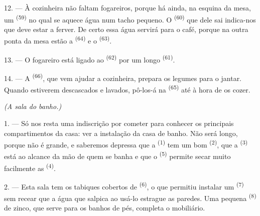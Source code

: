 12. --- À cozinheira não faltam fogareiros, porque há ainda, na esquina
da mesa, um  \textsuperscript{(59)} no qual se aquece água
num tacho pequeno. O  \textsuperscript{(60)} que dele sai indica-nos
que deve estar a ferver. De certo essa água servirá para o café, porque
na outra ponta da mesa estão a  \textsuperscript{(64)} e o
 \textsuperscript{(63)}.

13. --- O fogareiro está ligado ao  \textsuperscript{(62)} por
um longo  \textsuperscript{(61)}.

14. --- A  \textsuperscript{(66)}, que vem ajudar a
cozinheira, prepara os legumes para o jantar. Quando estiverem
descascados e lavados, pô-los-á na  \textsuperscript{(65)} até à
hora de os cozer.

\VUsaut{4.0mm}
{\centering\fontsize{10.2pt}{10.2pt}\selectfont{} \textit{(A sala do banho.)}\par}
\VUsaut{3.0mm}

1. --- Só nos resta uma indiscrição por cometer para conhecer os
principais compartimentos da casa: ver a instalação da casa de banho.
Não será longo, porque não é grande, e saberemos depressa que a
 \textsuperscript{(1)} tem um bom 
\textsuperscript{(2)}, que a  \textsuperscript{(3)} está ao alcance
da mão de quem se banha e que o  \textsuperscript{(5)} permite
secar muito facilmente as  \textsuperscript{(4)}.

2. --- Esta sala tem os tabiques cobertos de 
\textsuperscript{(6)}, o que permitiu instalar um 
\textsuperscript{(7)} sem recear que a água que salpica ao usá-lo estrague as
paredes. Uma pequena  \textsuperscript{(8)} de zinco, que serve para
os banhos de pés, completa o mobiliário.
\VUsaut{6.0mm}
\VUfilet{22mm}
